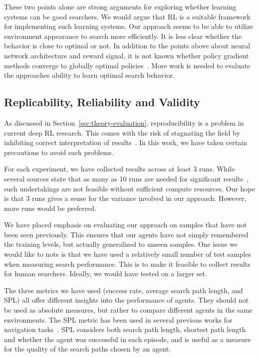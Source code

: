 These two points alone are strong arguments for exploring whether learning systems can be good searchers.
We would argue that RL is a suitable framework for implementing such learning systems.
Our approach seems to be able to utilize environment appearance to search more efficiently.
It is less clear whether the behavior is close to optimal or not.
In addition to the points above about neural network architecture and reward signal, it is not known whether policy gradient methods converge to globally optimal policies~\cite{agarwal_optimality_2020}.
More work is needed to evaluate the approaches ability to learn optimal search behavior.

\subsection{Replicability, Reliability and Validity}

As discussed in Section~\ref{sec:theory-evaluation}, reproducibility is a problem in current deep RL research.
This comes with the risk of stagnating the field by inhibiting correct interpretation of results~\cite{henderson_deep_2018}.
In this work, we have taken certain precautions to avoid such problems.

For each experiment, we have collected results across at least 3 runs.
While several sources state that as many as 10 runs are needed for significant results~\cite{colas_hitchhikers_2019,agarwal_deep_2022},
such undertakings are not feasible without sufficient compute resources.
Our hope is that 3 runs gives a sense for the variance involved in our approach.
However, more runs would be preferred.

We have placed emphasis on evaluating our approach on samples that have not been seen previously.
This ensures that our agents have not simply remembered the training levels, but actually generalized to unseen samples.
One issue we would like to note is that we have used a relatively small number of test samples when measuring search performance.
This is to make it feasible to collect results for human searchers.
Ideally, we would have tested on a larger set.

The three metrics we have used (success rate, average search path length, and SPL) all offer different insights into the performance of agents.
They should not be used as absolute measures, but rather to compare different agents in the same environments.
The SPL metric has been used in several previous works for navigation tasks~\cite{anderson_evaluation_2018,yang_visual_2018}.
SPL considers both search path length, shortest path length and whether the agent was successful in each episode,
and is useful as a measure for the quality of the search paths chosen by an agent.

